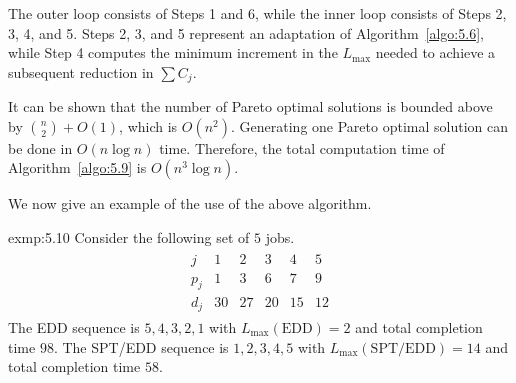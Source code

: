 The outer loop consists of Steps 1 and 6, while the inner loop consists of 
Steps 2, 3, 4, and 5. Steps 2, 3, and 5 represent an adaptation of 
Algorithm~\ref{algo:5.6}, while Step 4 computes the minimum increment 
in the $L_{\max}$ needed to achieve a subsequent reduction in $\sum C_j$. 

It can be shown that the number of Pareto optimal solutions is bounded 
above by $\binom{n}{2} + O(1)$, which is $O(n^2)$. Generating one Pareto optimal 
solution can be done in $O(n\log n)$ time. Therefore, the total computation 
time of Algorithm~\ref{algo:5.9} is $O(n^3\log n)$. 

We now give an example of the use of the above algorithm. 

\begin{exmp}{exmp:5.10}
    Consider the following set of $5$ jobs. 
    \begin{align*}
        \begin{array}{c|ccccc}
            j & 1 & 2 & 3 & 4 & 5 \\ \hline 
            p_j & 1 & 3 & 6 & 7 & 9 \\ 
            d_j & 30 & 27 & 20 & 15 & 12
        \end{array}
    \end{align*}
    The EDD sequence is $5, 4, 3, 2, 1$ with $L_{\max}(\text{EDD}) = 2$ 
    and total completion time $98$. The SPT/EDD sequence is $1, 2, 3, 4, 5$ with 
    $L_{\max}(\text{SPT/EDD}) = 14$ and total completion time $58$. 


\end{exmp}
